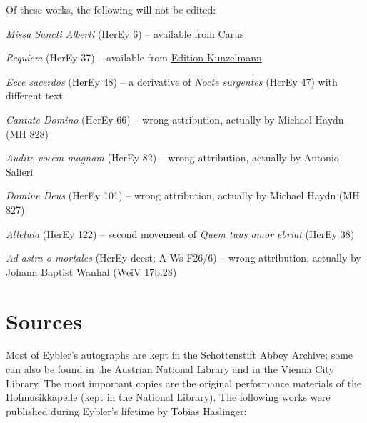 \documentclass{ees}
\begin{document}
Of these works, the following will not be edited:
\begin{bulletlist}
  \item \textit{Missa Sancti Alberti} (HerEy 6) – available from \href{https://www.carus-verlag.com/musiknoten-und-aufnahmen/eybler-missa-sancti-alberti-2708400.html}{Carus}
  \item \textit{Requiem} (HerEy 37) – available from \href{https://www.kunzelmann.ch/en/requiem-oct-10287}{Edition Kunzelmann}
  \item \textit{Ecce sacerdos} (HerEy 48) – a derivative of \textit{Nocte surgentes} (HerEy 47) with different text
  \item \textit{Cantate Domino} (HerEy 66) – wrong attribution, actually by Michael Haydn (MH 828)
  \item \textit{Audite vocem magnam} (HerEy 82) – wrong attribution, actually by Antonio Salieri
  \item \textit{Domine Deus} (HerEy 101) – wrong attribution, actually by Michael Haydn (MH 827)
  \item \textit{Alleluia} (HerEy 122) – second movement of \textit{Quem tuus amor ebriat} (HerEy 38)
  \item \textit{Ad astra o mortales} (HerEy deest; A-Ws F26/6) – wrong attribution, actually by Johann Baptist Wanhal (WeiV 17b.28)
\end{bulletlist}


\section{Sources}

Most of Eybler's autographs are kept in the Schottenstift Abbey Archive; some can also be found in the Austrian National Library and in the Vienna City Library. The most important copies are the original performance materials of the Hofmusikkapelle (kept in the National Library). The following works were published during Eybler's lifetime by Tobias Haslinger:
\end{document}
